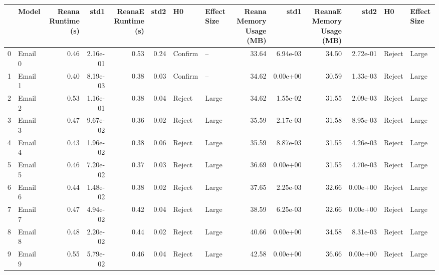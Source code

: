 \begin{tabular}{llrrrrllrrrrll}
\toprule
{} &     Model &  Reana Runtime (s) &      std1 &  ReanaE Runtime (s) &  std2 &       H0 & Effect Size &  Reana Memory Usage (MB) &      std1 &  ReanaE Memory Usage (MB) &      std2 &      H0 & Effect Size \\
\midrule
0  &   Email 0 &               0.46 &  2.16e-01 &                0.53 &  0.24 &  Confirm &          -- &                    33.64 &  6.94e-03 &                     34.50 &  2.72e-01 &  Reject &       Large \\
1  &   Email 1 &               0.40 &  8.19e-03 &                0.38 &  0.03 &  Confirm &          -- &                    34.62 &  0.00e+00 &                     30.59 &  1.33e-03 &  Reject &       Large \\
2  &   Email 2 &               0.53 &  1.16e-01 &                0.38 &  0.04 &   Reject &       Large &                    34.62 &  1.55e-02 &                     31.55 &  2.09e-03 &  Reject &       Large \\
3  &   Email 3 &               0.47 &  9.67e-02 &                0.36 &  0.02 &   Reject &       Large &                    35.59 &  2.17e-03 &                     31.58 &  8.95e-03 &  Reject &       Large \\
4  &   Email 4 &               0.43 &  1.96e-02 &                0.38 &  0.06 &   Reject &       Large &                    35.59 &  8.87e-03 &                     31.55 &  4.26e-03 &  Reject &       Large \\
5  &   Email 5 &               0.46 &  7.20e-02 &                0.37 &  0.03 &   Reject &       Large &                    36.69 &  0.00e+00 &                     31.55 &  4.70e-03 &  Reject &       Large \\
6  &   Email 6 &               0.44 &  1.48e-02 &                0.38 &  0.02 &   Reject &       Large &                    37.65 &  2.25e-03 &                     32.66 &  0.00e+00 &  Reject &       Large \\
7  &   Email 7 &               0.47 &  4.94e-02 &                0.42 &  0.04 &   Reject &       Large &                    38.59 &  6.25e-03 &                     32.66 &  0.00e+00 &  Reject &       Large \\
8  &   Email 8 &               0.48 &  2.20e-02 &                0.44 &  0.02 &   Reject &       Large &                    40.66 &  0.00e+00 &                     34.58 &  8.31e-03 &  Reject &       Large \\
9  &   Email 9 &               0.55 &  5.79e-02 &                0.46 &  0.04 &   Reject &       Large &                    42.58 &  0.00e+00 &                     36.66 &  0.00e+00 &  Reject &       Large \\

\end{tabular}
